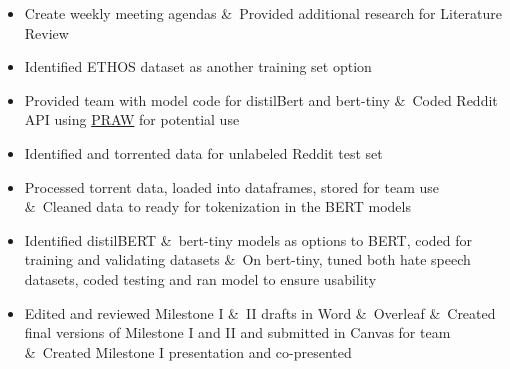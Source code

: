 \documentclass[conference]{IEEEtran}
\begin{document}
\begin{itemize}
   \item Create weekly meeting agendas \&\ Provided additional research for Literature Review
   \item Identified ETHOS dataset as another training set option
   \item Provided team with model code for distilBert and bert-tiny \&\ Coded Reddit API using \href{https://praw.readthedocs.io/en/stable/}{PRAW} for potential use  \item Identified and torrented data for unlabeled Reddit test set
   \item Processed torrent data, loaded into dataframes, stored for team use \&\ Cleaned data to ready for tokenization in the BERT models
   \item Identified distilBERT \&\ bert-tiny models as options to BERT, coded for training and validating datasets \&\ On bert-tiny, tuned both hate speech datasets, coded testing and ran model to ensure usability
   \item Edited and reviewed Milestone I \&\ II drafts in Word \&\ Overleaf \&\ Created final versions of Milestone I and II and submitted in Canvas for team \&\ Created Milestone I presentation and co-presented    
 \end{itemize}
\end{document}
